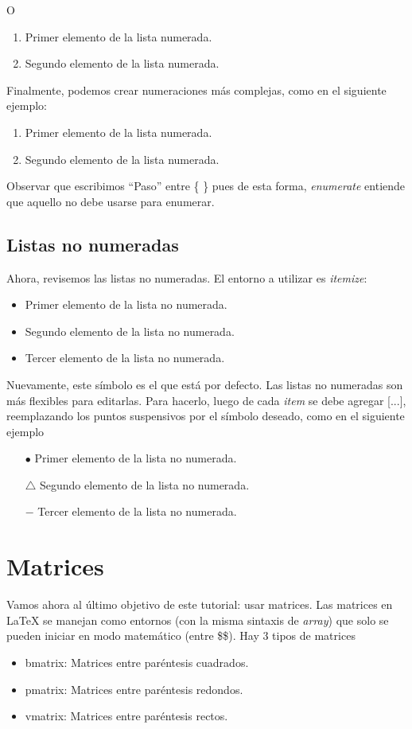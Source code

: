\documentclass{article}
\begin{document}
O
	\begin{enumerate}[\bf a)]
		\item Primer elemento de la lista numerada.
		\item Segundo elemento de la lista numerada.		
	\end{enumerate}

Finalmente, podemos crear numeraciones más complejas, como en el siguiente ejemplo:
	\begin{enumerate}[\bf {Paso} 1)]
		\item Primer elemento de la lista numerada.
		\item Segundo elemento de la lista numerada.		
	\end{enumerate}

Observar que escribimos ``Paso'' entre \{ \} pues de esta forma, \textit{enumerate} entiende que aquello no debe usarse para enumerar.

\subsection*{Listas no numeradas}
Ahora, revisemos las listas no numeradas. El entorno a utilizar es \textit{itemize}:
	\begin{itemize}
		\item Primer elemento de la lista no numerada.
		\item Segundo elemento de la lista no numerada.
		\item Tercer elemento de la lista no numerada.
	\end{itemize}

Nuevamente, este símbolo es el que está por defecto. Las listas no numeradas son más flexibles para editarlas. Para hacerlo, luego de cada \textit{item} se debe agregar [...], reemplazando los puntos suspensivos por el símbolo deseado, como en el siguiente ejemplo 
	\begin{itemize}
		\item[$\bullet$] Primer elemento de la lista no numerada.
		\item[$\triangle$] Segundo elemento de la lista no numerada.
		\item[$-$] Tercer elemento de la lista no numerada.
	\end{itemize}
	
\section*{Matrices}
Vamos ahora al último objetivo de este tutorial: usar matrices. Las matrices en LaTeX se manejan como entornos (con la misma sintaxis de \textit{array}) que solo se pueden iniciar en modo matemático (entre \$\$). Hay 3 tipos de matrices
	\begin{itemize}
		\item bmatrix: Matrices entre paréntesis cuadrados.
		\item pmatrix: Matrices entre paréntesis redondos.
		\item vmatrix: Matrices entre paréntesis rectos.
	\end{itemize}
\end{document}

